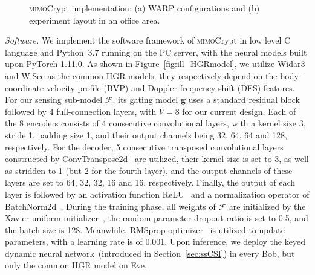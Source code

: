 \documentclass[conference,compsoc]{IEEEtran}
\newcommand{\sname}{\textsc{mimo}Crypt\xspace}
\begin{document}
\begin{figure}[b]
	\setlength\abovecaptionskip{8pt}
	\vspace{-1ex}
	\centering
	\hfill
	\caption{\sname implementation: (a) WARP configurations and (b) experiment layout in an office area.}
	\label{fig:experiement_setting}
	\vspace{-1ex}
\end{figure}

\emph{Software.} 
%
We implement the software framework of \sname in low level C language and Python~3.7 running on the PC server, with the neural models built upon PyTorch 1.11.0. As shown in Figure~\ref{fig:ill_HGRmodel}, we utilize Widar3 and WiSee as the common HGR models; they respectively depend on the body-coordinate velocity profile (BVP) and Doppler frequency shift (DFS) features. For our sensing sub-model $\mathcal{F}$, its gating model $\mathbf{g}$ uses a standard residual block~\cite{He_2016_CVPR} followed by 4 full-connection layers, with $V = 8$ for our current design. Each of the 8 encoders consists of 4 consecutive convolutional layers, with a kernel size 3, stride 1, padding size 1, and their output channels being 32, 64, 64 and 128, respectively. For the decoder, 5 consecutive transposed convolutional layers constructed by ConvTranspose2d~\cite{ConvTranspose2d} are utilized, their kernel size is set to 3, as well as stridden to 1 (but 2 for the fourth layer), and the output channels of these layers are set to 64, 32, 32, 16 and 16, respectively. Finally, the output of each layer is followed by an activation function ReLU~\cite{ReLU-ICML10} and a normalization operator of BatchNorm2d~\cite{BatchNor-ICML15}. 
%
During the training phase, all weights of $\mathcal{F}$ are initialized by the Xavier uniform initializer~\cite{Xavier}, the random parameter dropout ratio is set to 0.5, and the batch size is 128. Meanwhile, RMSprop optimizer~\cite{RMSprop} is utilized to update parameters, with a learning rate is of 0.001. Upon inference, we deploy the keyed dynamic neural network~(introduced in Section~\ref{sec:ssCSI}) in every Bob, but only the common HGR model on Eve.
\end{document}

